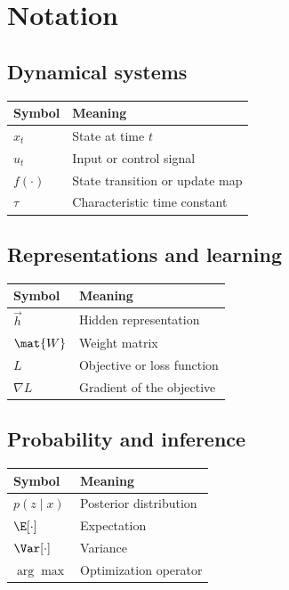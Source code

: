 \chapter*{Notation}

\section*{Dynamical systems}

\begin{tabular}{@{}ll@{}}
  \toprule
  \textbf{Symbol} & \textbf{Meaning} \\
  \midrule
  $x_t$ & State at time $t$ \\
  $u_t$ & Input or control signal \\
  $f(\cdot)$ & State transition or update map \\
  $\tau$ & Characteristic time constant \\
  \bottomrule
\end{tabular}

\section*{Representations and learning}

\begin{tabular}{@{}ll@{}}
  \toprule
  \textbf{Symbol} & \textbf{Meaning} \\
  \midrule
  $\vec{h}$ & Hidden representation \\
  $\mat{W}$ & Weight matrix \\
  $L$ & Objective or loss function \\
  $\nabla L$ & Gradient of the objective \\
  \bottomrule
\end{tabular}

\section*{Probability and inference}

\begin{tabular}{@{}ll@{}}
  \toprule
  \textbf{Symbol} & \textbf{Meaning} \\
  \midrule
  $p(z \mid x)$ & Posterior distribution \\
  $\E[\cdot]$ & Expectation \\
  $\Var[\cdot]$ & Variance \\
  $\arg\max$ & Optimization operator \\
  \bottomrule
\end{tabular}
